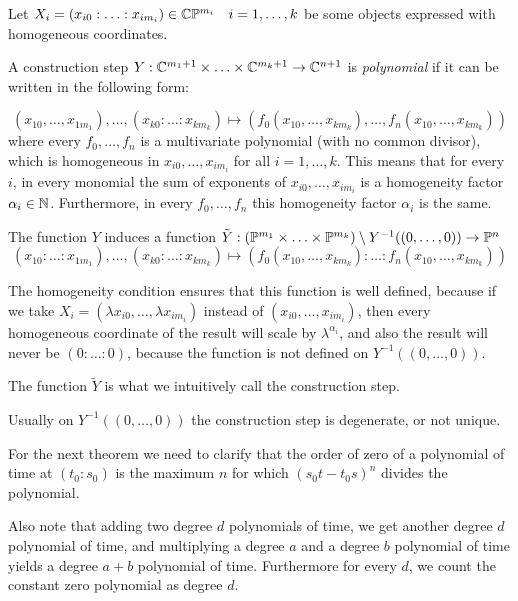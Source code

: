 \documentclass[a4paper]{article}
\begin{document}
\begin{definition}
    Let $X_i=(x_{i0}:\ldots:x_{im_i})\in \mathbb{C}\mathbb{P}^{m_i}\quad i=1,\ldots ,k$ be some objects expressed with homogeneous coordinates.

    A construction step $Y:\mathbb{C}^{m_1+1} \times \ldots \times \mathbb{C}^{m_k+1} \to \mathbb{C}^{n+1}$ is \textit{polynomial} if it can be written in the following form:

    $$(x_{10},\ldots,x_{1m_1}),\ldots,(x_{k0}:\ldots:x_{km_k})\mapsto (f_0(x_{10},\ldots ,x_{km_k}),\ldots ,f_n(x_{10},\ldots ,x_{km_k}))$$
    where every $f_0,\ldots ,f_n$ is a multivariate polynomial (with no common divisor), which is homogeneous in $x_{i0},\ldots ,x_{im_i}$ for all $i=1,\ldots, k$. This means that for every $i$, in every monomial the sum of exponents of $x_{i0},\ldots ,x_{im_i}$ is a homogeneity factor $\alpha_i\in \mathbb{N}$. Furthermore, in every $f_0,\ldots ,f_n$ this homogeneity factor $\alpha_i$ is the same.


\end{definition}
The function $Y$ induces a function $\tilde{Y}:(\mathbb{P}^{m_1} \times \ldots \times \mathbb{P}^{m_k}) \setminus Y^{-1}((0,\ldots,0))\to \mathbb{P}^n$
$$(x_{10}:\ldots:x_{1m_1}),\ldots,(x_{k0}:\ldots:x_{km_k})\mapsto (f_0(x_{10},\ldots ,x_{km_k}):\ldots :f_n(x_{10},\ldots ,x_{km_k}))$$

The homogeneity condition ensures that this function is well defined, because if we take $X_i=(\lambda x_{i0},\ldots ,\lambda x_{im_i})$ instead of $(x_{i0},\ldots ,x_{im_i})$, then every homogeneous coordinate of the result will scale by $\lambda^{\alpha_i}$, and also the result will never be $(0:\ldots:0)$, because the function is not defined on $Y^{-1}((0,\ldots,0))$.

The function $\tilde{Y}$ is what we intuitively call the construction step.

Usually on $Y^{-1}((0,\ldots,0))$ the construction step is degenerate, or not unique.

For the next theorem we need to clarify that the order of zero of a polynomial of time at $(t_0:s_0)$ is the maximum $n$ for which $(s_0t-t_0s)^n$ divides the polynomial.

Also note that adding two degree $d$ polynomials of time, we get another degree $d$ polynomial of time, and multiplying a degree $a$ and a degree $b$ polynomial of time yields a degree $a+b$ polynomial of time. Furthermore for every $d$, we count the constant zero polynomial as degree $d$.
\end{document}
